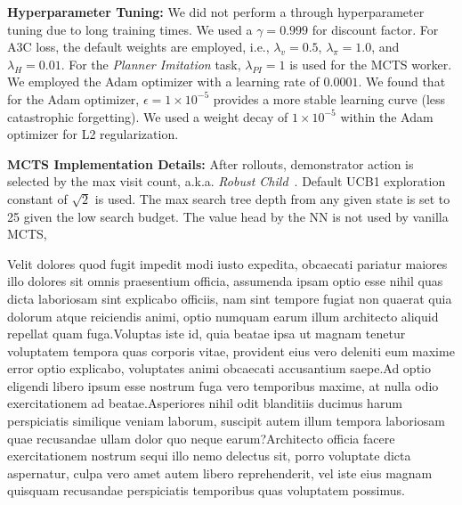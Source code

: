 \documentclass[letterpaper]{article} %
\begin{document}
\textbf{Hyperparameter Tuning:} We did not perform a through hyperparameter tuning due to long training times. We used a $\gamma=0.999$ for discount factor. For A3C loss, the default weights are employed, i.e., $\lambda_{v}=0.5$, $\lambda_{\pi}=1.0$, and $\lambda_{H}=0.01$. For the \emph{Planner Imitation} task, $\lambda_{PI}=1$ is used for the MCTS worker. We employed the Adam optimizer with a learning rate of $0.0001$. We found that for the Adam optimizer, $\epsilon = 1\times10^{-5}$ provides a more stable learning curve (less catastrophic forgetting). We used a weight decay of $1\times10^{-5}$ within the Adam optimizer for L2 regularization.

\textbf{MCTS Implementation Details:} After rollouts, demonstrator action is selected by the max visit count, a.k.a. \textit{Robust Child}~\cite{browne2012survey}. Default UCB1 exploration constant of $\sqrt{2}$ is used. The max search tree depth from any given state is set to 25 given the low search budget. The value head by the NN is not used by vanilla MCTS, %



\small
Velit dolores quod fugit impedit modi iusto expedita, obcaecati pariatur maiores illo dolores sit omnis praesentium officia, assumenda ipsam optio esse nihil quas dicta laboriosam sint explicabo officiis, nam sint tempore fugiat non quaerat quia dolorum atque reiciendis animi, optio numquam earum illum architecto aliquid repellat quam fuga.Voluptas iste id, quia beatae ipsa ut magnam tenetur voluptatem tempora quas corporis vitae, provident eius vero deleniti eum maxime error optio explicabo, voluptates animi obcaecati accusantium saepe.Ad optio eligendi libero ipsum esse nostrum fuga vero temporibus maxime, at nulla odio exercitationem ad beatae.Asperiores nihil odit blanditiis ducimus harum perspiciatis similique veniam laborum, suscipit autem illum tempora laboriosam quae recusandae ullam dolor quo neque earum?Architecto officia facere exercitationem nostrum sequi illo nemo delectus sit, porro voluptate dicta aspernatur, culpa vero amet autem libero reprehenderit, vel iste eius magnam quisquam recusandae perspiciatis temporibus quas voluptatem possimus.\clearpage

\end{document}
